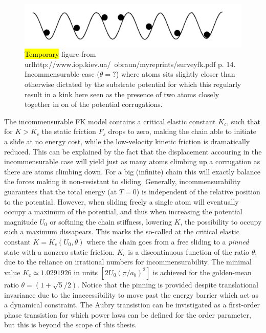 \begin{figure}[H]
  \centering
  \includegraphics[width=0.5\linewidth]{figures/theory/incommensurable_example.png}
  \caption{\hl{Temporary} figure from
  url{http://www.iop.kiev.ua/~obraun/myreprints/surveyfk.pdf} p. 14.
  Incommensurable case ($\theta = ?$) where atoms sits slightly closer than
  otherwise dictated by the substrate potential for which this regularly result
  in a kink here seen as the presence of two atoms closely together in on of the
  potential corrugations.}
  \label{fig:incommensurable_example}
\end{figure}


The incommensurable \acrshort{FK} model contains a critical elastic constant $K_c$, such that for $K > K_c$ the static friction $F_s$ drops to zero, making the chain able to initiate a slide at no energy cost, while the low-velocity kinetic friction is dramatically reduced. This can be explained by the
fact that the displacement accouring in the incommensurable case will yield just
as many atoms climbing up a corrugation as there are atoms climbing down. For a big (infinite) chain this will exactly balance the forces making it
non-resistant to sliding. Generally, incommensurability guarantees that the
total energy (at $T=0$) is independent of the relative position to the
potential. However, when sliding freely a single atom will eventually occupy a
maximum of the potential, and thus when increasing the potential magnitude $U_0$ or
softning the chain stiffness, lowering $K$, the possibility to occupy such a
maximum dissapears. This marks the so-called 
at the critical elastic constant $K = K_c(U_0, \theta)$ where the chain goes
from a free sliding to a \textit{pinned} state with a nonzero static friction.
$K_c$ is a discontinuous function of the ratio $\theta$, due to the reliance on
irrational numbers for incommensurability. The minimal
value $K_c \simeq 1.0291926 $ in units $[2 U_0 (\pi / a_b)^2]$ is achieved for
the golden-mean ratio $\theta = (1+\sqrt{5}/2)$. Notice that the pinning is
provided despite translational invariance due to the inaccessibility to move
past the energy barrier which act as a dynamical constraint. The Aubry transistion can be invistigated as a first-order phase transistion for which power laws can be defined for the order parameter, but this is beyond the scope of this thesis.

